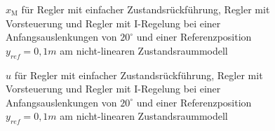 \begin{figure}[H]
    \centering
    \caption[Reglervergleich für $x_{\mathrm{M}}$ (nicht-linear)]{$x_{\mathrm{M}}$ für Regler mit einfacher Zustandsrückführung, Regler mit Vorsteuerung und Regler mit I-Regelung bei einer Anfangsauslenkungen von $20^\circ$ und einer Referenzposition $y_{ref} = 0,1 m$ am nicht-linearen Zustandsraummodell}
    \label{fig:Bild41}
\end{figure}

\begin{figure}[H]
    \centering
    \caption[Reglervergleich für $u$ (nicht-linear)]{$u$ für Regler mit einfacher Zustandsrückführung, Regler mit Vorsteuerung und Regler mit I-Regelung bei einer Anfangsauslenkungen von $20^\circ$ und einer Referenzposition $y_{ref} = 0,1 m$ am nicht-linearen Zustandsraummodell}
    \label{fig:Bild42}
\end{figure}